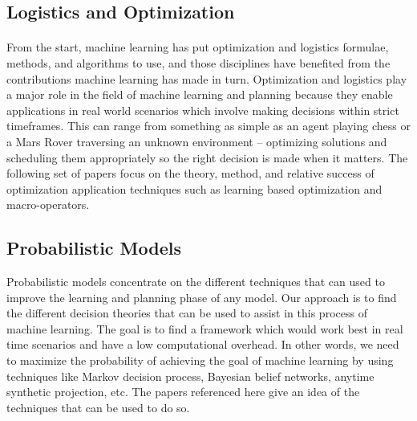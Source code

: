 \documentclass[tog]{acmsiggraph}
\begin{document}

\subsection{Logistics and Optimization}

\paragraph{}

From the start, machine learning has put optimization and logistics formulae, methods, and algorithms to use, and those disciplines have benefited from the contributions machine learning has made in turn. Optimization and logistics play a major role in the field of machine learning and planning because they enable applications in real world scenarios which involve making decisions within strict timeframes. This can range from something as simple as an agent playing chess or a Mars Rover traversing an unknown environment -- optimizing solutions and scheduling them appropriately so the right decision is made when it matters. The following set of papers focus on the theory, method, and relative success of optimization application techniques such as learning based optimization and macro-operators.



\subsection{Probabilistic Models}

Probabilistic models concentrate on the different techniques that can used to improve the learning and planning phase of any model. Our approach is to find the different decision theories that can be used to assist in this process of machine learning. The goal is to find a framework which would work best in real time scenarios and have a low computational overhead. In other words, we need to maximize the probability of achieving the goal of machine learning by using techniques like Markov decision process, Bayesian belief networks, anytime synthetic projection, etc. The papers referenced here give an idea of the techniques that can be used to do so.
\end{document}
